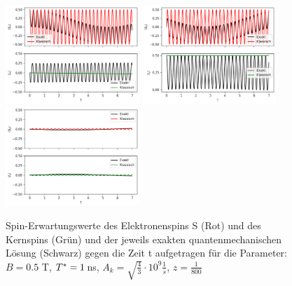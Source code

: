 \begin{figure}[h]
    \centering
    \includegraphics[width = 0.45\textwidth]{Abbildungen/Plot_Sx.png}
    \includegraphics[width = 0.45\textwidth]{Abbildungen/Plot_Sy.png}
    \includegraphics[width = 0.45\textwidth]{Abbildungen/Plot_Sz.png}
    \caption{Spin-Erwartungswerte des Elektronenspins S (Rot) und des Kernspins (Grün) und der jeweils exakten quantenmechanischen Lösung
    (Schwarz) gegen die Zeit t aufgetragen für die Parameter: $B = 0.5$ T, $T^*= 1 \thinspace$ns, $A_k = \sqrt{\frac{4}{3}}\cdot 10^9 \frac{1}{s}$,
    $z=\frac{1}{800}$}
    \label{fig:Plots_2D}
\end{figure}

